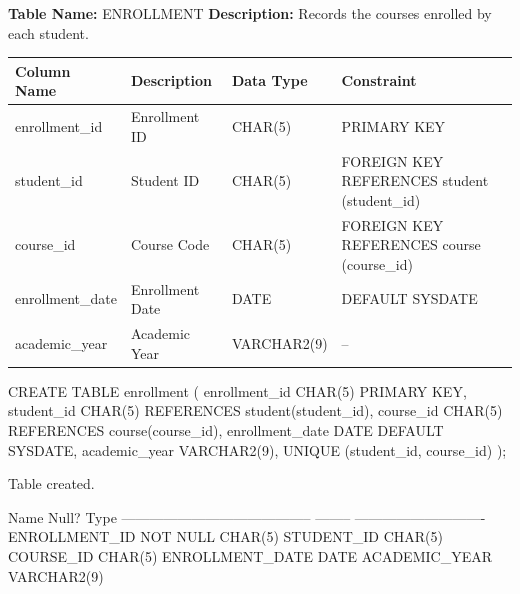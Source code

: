 
\textbf{Table Name:} ENROLLMENT \hspace{1em plus 1fill}
\textbf{Description:} Records the courses enrolled by each student.

\vspace{8pt}

\renewcommand{\arraystretch}{1.4}
\begin{tabularx}{\textwidth}{|>{\raggedright\arraybackslash}X|>{\raggedright\arraybackslash}X|>{\raggedright\arraybackslash}X|>{\raggedright\arraybackslash}X|}
\hline
\textbf{Column Name} & \textbf{Description} & \textbf{Data Type} & \textbf{Constraint} \\
\hline
enrollment\_id & Enrollment ID & CHAR(5) & PRIMARY KEY \\
\hline
student\_id & Student ID & CHAR(5) & FOREIGN KEY REFERENCES student (student\_id) \\
\hline
course\_id & Course Code & CHAR(5) & FOREIGN KEY REFERENCES course (course\_id) \\
\hline
enrollment\_date & Enrollment Date & DATE & DEFAULT SYSDATE \\
\hline
academic\_year & Academic Year & VARCHAR2(9) & -- \\
\hline
\end{tabularx}

\vspace{14pt}


\begin{sqlcode}
CREATE TABLE enrollment (
    enrollment_id   CHAR(5)      PRIMARY KEY,
    student_id      CHAR(5)      REFERENCES student(student_id),
    course_id       CHAR(5)      REFERENCES course(course_id),
    enrollment_date DATE         DEFAULT SYSDATE,
    academic_year   VARCHAR2(9),
    UNIQUE (student_id, course_id)
);
\end{sqlcode}

\vspace{16pt}


\begin{sqlout}
Table created.

 Name                                      Null?    Type
 ----------------------------------------- -------- ----------------------------
 ENROLLMENT_ID                             NOT NULL CHAR(5)
 STUDENT_ID                                         CHAR(5)
 COURSE_ID                                          CHAR(5)
 ENROLLMENT_DATE                                    DATE
 ACADEMIC_YEAR                                      VARCHAR2(9)
\end{sqlout}

\clearpage
